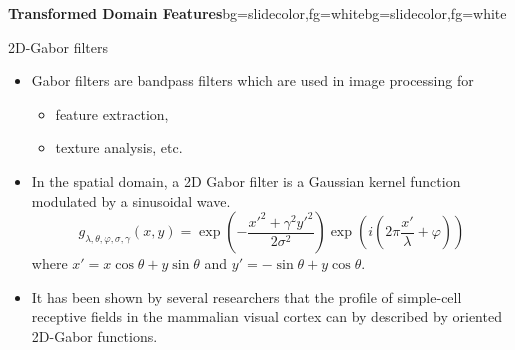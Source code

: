 \begin{frame}{}
\begin{variableblock}{\centering \Large \textbf{\vspace{4pt}\newline Transformed Domain Features\vspace{4pt}}}{bg=slidecolor,fg=white}{bg=slidecolor,fg=white}
\end{variableblock}
\end{frame}


\begin{frame}{2D-Gabor filters}
\begin{itemize}
\item Gabor filters are bandpass filters which are used in image processing for
\begin{itemize}
\item feature extraction,
\item texture analysis, etc.
\end{itemize}   
\item In the spatial domain, a 2D Gabor filter is a Gaussian kernel function modulated by a sinusoidal wave. 
\begin{equation}
{g_{\lambda ,\theta ,\varphi ,\sigma ,\gamma }}(x,y) = \exp \left( { - \frac{{x{'^2} + {\gamma ^2}y{'^2}}}{{2{\sigma ^2}}}} \right)\exp \left( i\left({2\pi \frac{{x'}}{\lambda } + \varphi }\right) \right)\nonumber
\end{equation}
where $x'=x\cos\theta+y\sin \theta$ and $y'=-\sin \theta+y\cos \theta$.
\item It has been shown by several researchers that the profile of simple-cell receptive fields in the mammalian visual cortex can by described by oriented 2D-Gabor functions.
\end{itemize}
\end{frame}

